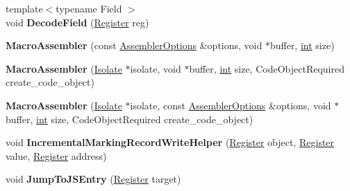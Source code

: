 \begin{DoxyCompactItemize}
\item 
\mbox{\label{classv8_1_1internal_1_1MacroAssembler_a132efbdb5d6abe37ed26edc851c715f0}} 
{\footnotesize template$<$typename Field $>$ }\\void {\bfseries Decode\+Field} (\mbox{\hyperlink{classv8_1_1internal_1_1Register}{Register}} reg)
\item 
\mbox{\label{classv8_1_1internal_1_1MacroAssembler_ab454c229ecab5061af905b7d5959c919}} 
{\bfseries Macro\+Assembler} (const \mbox{\hyperlink{structv8_1_1internal_1_1AssemblerOptions}{Assembler\+Options}} \&options, void $\ast$buffer, \mbox{\hyperlink{classint}{int}} size)
\item 
\mbox{\label{classv8_1_1internal_1_1MacroAssembler_ace8e2b09ca4bac1b40d12d84416284f9}} 
{\bfseries Macro\+Assembler} (\mbox{\hyperlink{classv8_1_1internal_1_1Isolate}{Isolate}} $\ast$isolate, void $\ast$buffer, \mbox{\hyperlink{classint}{int}} size, Code\+Object\+Required create\+\_\+code\+\_\+object)
\item 
\mbox{\label{classv8_1_1internal_1_1MacroAssembler_a118ab3d38490e9a50ee0157274ac3dc9}} 
{\bfseries Macro\+Assembler} (\mbox{\hyperlink{classv8_1_1internal_1_1Isolate}{Isolate}} $\ast$isolate, const \mbox{\hyperlink{structv8_1_1internal_1_1AssemblerOptions}{Assembler\+Options}} \&options, void $\ast$buffer, \mbox{\hyperlink{classint}{int}} size, Code\+Object\+Required create\+\_\+code\+\_\+object)
\item 
\mbox{\label{classv8_1_1internal_1_1MacroAssembler_abcee3f965e4bf2002f13d26238a30bd7}} 
void {\bfseries Incremental\+Marking\+Record\+Write\+Helper} (\mbox{\hyperlink{classv8_1_1internal_1_1Register}{Register}} object, \mbox{\hyperlink{classv8_1_1internal_1_1Register}{Register}} value, \mbox{\hyperlink{classv8_1_1internal_1_1Register}{Register}} address)
\item 
\mbox{\label{classv8_1_1internal_1_1MacroAssembler_aa7b37b7bfd437a5c063b239331eb20c6}} 
void {\bfseries Jump\+To\+J\+S\+Entry} (\mbox{\hyperlink{classv8_1_1internal_1_1Register}{Register}} target)
\item 

\end{DoxyCompactItemize}
